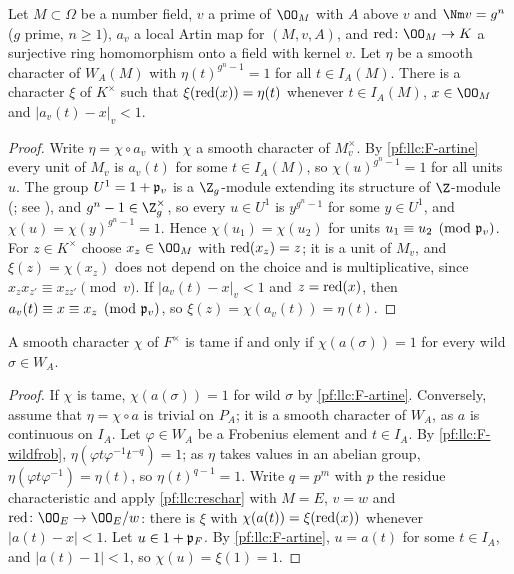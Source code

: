 \begin{lemma}\label{pf:llc:reschar}
Let $M\subset\Omega$ be a number field, $v$ a prime of $\OO_M$ with $A$ above $v$ and $\Nm v=g^n$ ($g$ prime,
$n\ge1$), $a_v$ a local Artin map for $(M,v,A)$, and $\llcred\colon\OO_M\to K$ a surjective ring
homomorphism onto a field with kernel $v$. Let $\eta$ be a smooth character of $W_A(M)$ with
$\eta(t)^{g^n-1}=1$ for all $t\in I_A(M)$. There is a character $\xi$ of $K^\times$ such that
$\xi(\operatorname{red}(x))=\eta(t)$ whenever $t\in I_A(M)$, $x\in\OO_M$ and $|a_v(t)-x|_v<1$.
\end{lemma}

\begin{proof}
Write $\eta=\chi\circ a_v$ with $\chi$ a smooth character of $M_v^\times$. By \ref{pf:llc:F-artine} every unit of
$M_v$ is $a_v(t)$ for some $t\in I_A(M)$, so $\chi(u)^{g^n-1}=1$ for all units $u$. The group $U^1=1+\mathfrak p_v$ is a
$\Z_g$-module extending its structure of $\Z$-module (;
see \cite[Ch.~II, \S5]{Neukirch1999}), and $g^n-1\in\Z_g^\times$, so every $u\in U^1$ is $y^{g^n-1}$ for some
$y\in U^1$, and $\chi(u)=\chi(y)^{g^n-1}=1$. Hence $\chi(u_1)=\chi(u_2)$ for units $u_1\equiv u_2\pmod{\mathfrak p_v}$.
For $z\in K^\times$ choose $x_z\in\OO_M$ with $\operatorname{red}(x_z)=z$; it is a unit of $M_v$, and $\xi(z)=\chi(x_z)$ does not
depend on the choice and is multiplicative, since $x_zx_{z'}\equiv x_{zz'}\pmod v$. If $|a_v(t)-x|_v<1$ and
$z=\operatorname{red}(x)$, then $a_v(t)\equiv x\equiv x_z\pmod{\mathfrak p_v}$, so $\xi(z)=\chi(a_v(t))=\eta(t)$.
\end{proof}

\begin{lemma}\label{pf:llc:tameart}
A smooth character $\chi$ of $F^\times$ is tame if and only if $\chi(a(\sigma))=1$ for every wild
$\sigma\in W_A$. 
\end{lemma}

\begin{proof}
If $\chi$ is tame, $\chi(a(\sigma))=1$ for wild $\sigma$ by \ref{pf:llc:F-artine}. Conversely, assume that
$\eta=\chi\circ a$ is trivial on $P_A$; it is a smooth character of $W_A$, as $a$ is continuous on $I_A$. Let
$\varphi\in W_A$ be a Frobenius element and $t\in I_A$. By \ref{pf:llc:F-wildfrob},
$\eta(\varphi t\varphi^{-1}t^{-q})=1$; as $\eta$ takes values in an abelian group,
$\eta(\varphi t\varphi^{-1})=\eta(t)$, so $\eta(t)^{q-1}=1$. Write $q=p^m$ with $p$ the residue characteristic
and apply \cref{pf:llc:reschar} with $M=E$, $v=w$ and $\llcred\colon\OO_E\to\OO_E/w$: there is $\xi$ with
$\chi(a(t))=\xi(\operatorname{red}(x))$ whenever $|a(t)-x|<1$. Let $u\in1+\mathfrak p_F$. By \ref{pf:llc:F-artine},
$u=a(t)$ for some $t\in I_A$, and $|a(t)-1|<1$, so $\chi(u)=\xi(1)=1$.
\end{proof}

